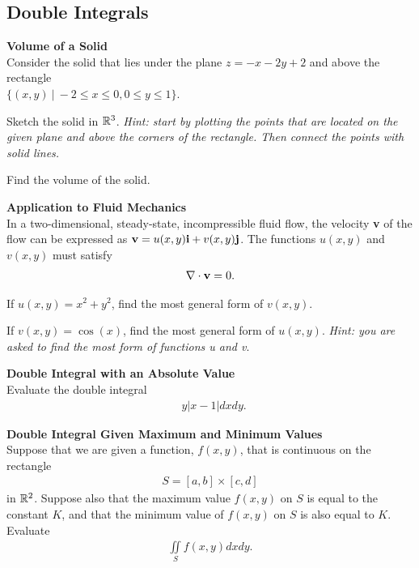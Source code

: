 \subsection{Double Integrals}

\BEN
\item %
\textbf{Volume of a Solid} \\
Consider the solid that lies under the plane $z = -x-2y+2$ and above the rectangle \\$\{(x,y) \ | \ -2\le x\le 0, 0\le y \le1 \}$.
\BEN
\item Sketch the solid in $\mathbb{R}^3$. \textit{Hint: start by plotting the points that are located on the given plane and above the corners of the rectangle. Then connect the points with solid lines.}
\item Find the volume of the solid.
\EEN
\item %
\textbf{Application to Fluid Mechanics} \\
In a two-dimensional, steady-state, incompressible fluid flow, the velocity \textbf{v} of the flow can be expressed as $\mathbf{v} = u(x,y)\mathbf{i} + v(x,y)\mathbf{j}$. The functions $u(x,y)$ and $v(x,y)$ must satisfy 
\begin{align*}
  \nabla\cdot\mathbf{v} = 0.
\end{align*}
\BEN
\item If $u(x,y) = x^2 + y^2$, find the most general form of $v(x,y)$. 
\item If $v(x,y) = \cos(x)$, find the most general form of $u(x,y)$.
\EEN
\textit{Hint: you are asked to find the most  form of functions u and v}.
\item %
\textbf{Double Integral with an Absolute Value}\\
Evaluate the double integral
\begin{align*}
  \mathop{\int_{0}^{1} \! \int_0^{2}  }y \big| x-1\big| dxdy.
\end{align*}
\item %
\textbf{Double Integral Given Maximum and Minimum Values}\\
Suppose that we are given a function, $f(x,y)$, that is continuous on the rectangle 
\begin{align*}
S = [a,b]\times[c,d]
\end{align*}
in $\mathbb{R}^2$. Suppose also that the maximum value $f(x,y)$ on $S$ is equal to the constant $K$, and that the minimum value of $f(x,y)$ on $S$ is also equal to $K$. Evaluate
\begin{align*}
  \iint\limits_S f(x,y) dxdy.
\end{align*}
\EEN %

